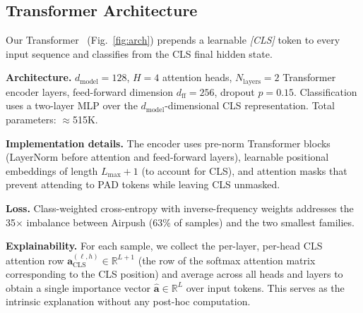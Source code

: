 \documentclass[12pt]{report}
\begin{document}
\subsection{Transformer Architecture}
\label{sec:arch}

Our Transformer~\citep{vaswani2017attention} (Fig.~\ref{fig:arch})
prepends a learnable \textit{[CLS]} token to every input sequence and
classifies from the CLS final hidden state.

\textbf{Architecture.}
$d_{\text{model}}=128$, $H=4$ attention heads, $N_{\text{layers}}=2$
Transformer encoder layers, feed-forward dimension $d_{\text{ff}}=256$,
dropout $p=0.15$. Classification uses a two-layer MLP over the
$d_{\text{model}}$-dimensional CLS representation. Total parameters:
$\approx$515K.

\textbf{Implementation details.}
The encoder uses pre-norm Transformer blocks (LayerNorm before attention
and feed-forward layers), learnable positional embeddings of length
$L_{\max}+1$ (to account for CLS), and attention masks that prevent
attending to PAD tokens while leaving CLS unmasked.

\textbf{Loss.}
Class-weighted cross-entropy with inverse-frequency weights addresses
the 35$\times$ imbalance between Airpush (63\% of samples) and the
two smallest families.

\textbf{Explainability.}
For each sample, we collect the per-layer, per-head CLS attention row
$\mathbf{a}^{(\ell,h)}_{\text{CLS}} \in \mathbb{R}^{L+1}$
(the row of the softmax attention matrix corresponding to the CLS
position) and average across all heads and layers to obtain a single
importance vector $\hat{\mathbf{a}} \in \mathbb{R}^{L}$ over input
tokens. This serves as the intrinsic explanation without any
post-hoc computation.
\end{document}
